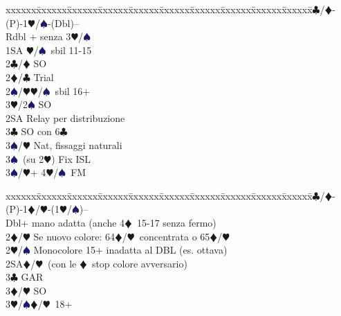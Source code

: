 \documentclass[a4paper,italian]{article}
\newcommand{\BC}{\textcolor{OliveGreen}{$\clubsuit$}}
\newcommand{\BD}{\textcolor{RedOrange}{$\vardiamondsuit$}}
\newcommand{\BH}{\textcolor{Red2}{$\varheartsuit${}}}
\newcommand{\BS}{\textcolor{MidnightBlue}{$\spadesuit${}}}
\newenvironment{bidtable}
{\begin{tabbing}

    xxxxxx\=xxxxxx\=xxxxxx\=xxxxxx\=xxxxxx\=xxxxxx\=xxxxxx\=xxxxxx\=xxxxxx\=xxxxxx\=\kill}
{\end{tabbing} }%
\begin{document}
\begin{multicols}{2}
\begin{tcolorbox}[colframe=azzurro,title={Sviluppi particolari, validi in situazioni analoghe}]
                                            \begin{bidtable}
                                                1\BC/\BD-(P)-1\BH/\BS-(Dbl)--\\
                                                Rdbl + senza 3\BH/\BS\\
                                                1SA \BH/\BS\ sbil 11-15\+\\
                                                2\BC/\BD\> SO\\
                                                2\BD/\BC\> Trial\-\\
                                                2\BS/\BH{}\BH/\BS\ sbil 16+\+\\
                                                3\BH/2\BS\> SO\\
                                                2SA\> Relay per distribuzione\\
                                                3\BC\> SO con 6\BC\\
                                                3\BS/\BH\> Nat, fissaggi naturali\\
                                                3\BS\ (su 2\BH)\>\> Fix ISL\-\\
                                                3\BS/\BH {}+ 4\BH/\BS\ FM
                                            \end{bidtable}

                                            \bigskip

                                            \begin{bidtable}
                                                1\BC/\BD-(P)-1\BD/\BH-(1\BH/\BS)--\\
                                                Dbl+ mano adatta (anche 4\BD\ 15-17 senza fermo)\\
                                                2\BD/\BH\> Se nuovo colore: 64\BD/\BH\ concentrata o 65\BD/\BH\\
                                                2\BH/\BS\> Monocolore 15+ inadatta al DBL (es. ottava)\\
                                                2SA\BD/\BH\ (con le \BD\ stop colore avversario)\+\\
                                                3\BC\> GAR\\
                                                3\BD/\BH\> SO\-\\
                                                3\BH/\BS{}\BD/\BH\ 18+
                                            \end{bidtable}

                                        \end{tcolorbox}
                                    \end{multicols}
\end{document}
